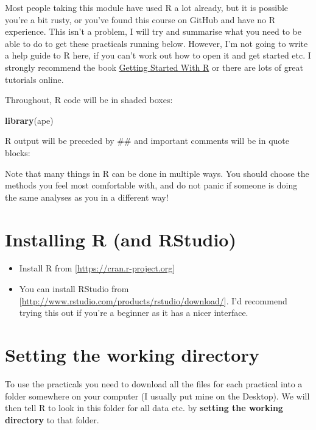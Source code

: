 \documentclass[]{book}
\newenvironment{Shaded}{\begin{snugshade}}{\end{snugshade}}
\newcommand{\KeywordTok}[1]{\textcolor[rgb]{0.13,0.29,0.53}{\textbf{{#1}}}}
\newcommand{\NormalTok}[1]{{#1}}
\providecommand{\tightlist}{%
  \setlength{\itemsep}{0pt}\setlength{\parskip}{0pt}}
\theoremstyle{definition}
\theoremstyle{definition}
\theoremstyle{definition}
\theoremstyle{remark}
\begin{document}
Most people taking this module have used R a lot already, but it is
possible you're a bit rusty, or you've found this course on GitHub and
have no R experience. This isn't a problem, I will try and summarise
what you need to be able to do to get these practicals running below.
However, I'm not going to write a help guide to R here, if you can't
work out how to open it and get started etc. I strongly recommend the
book \href{http://www.r4all.org/}{Getting Started With R} or there are
lots of great tutorials online.

Throughout, R code will be in shaded boxes:

\begin{Shaded}
\begin{Highlighting}[]
\KeywordTok{library}\NormalTok{(ape)}
\end{Highlighting}
\end{Shaded}

R output will be preceded by \#\# and important comments will be in
quote blocks:

Note that many things in R can be done in multiple ways. You should
choose the methods you feel most comfortable with, and do not panic if
someone is doing the same analyses as you in a different way!

\section{Installing R (and RStudio)}\label{installing-r-and-rstudio}

\begin{itemize}
\tightlist
\item
  Install R from {[}\url{https://cran.r-project.org}{]}
\item
  You can install RStudio from
  {[}\url{http://www.rstudio.com/products/rstudio/download/}{]}. I'd
  recommend trying this out if you're a beginner as it has a nicer
  interface.
\end{itemize}

\section{Setting the working
directory}\label{setting-the-working-directory}

To use the practicals you need to download all the files for each
practical into a folder somewhere on your computer (I usually put mine
on the Desktop). We will then tell R to look in this folder for all data
etc. by \textbf{setting the working directory} to that folder.
\end{document}
